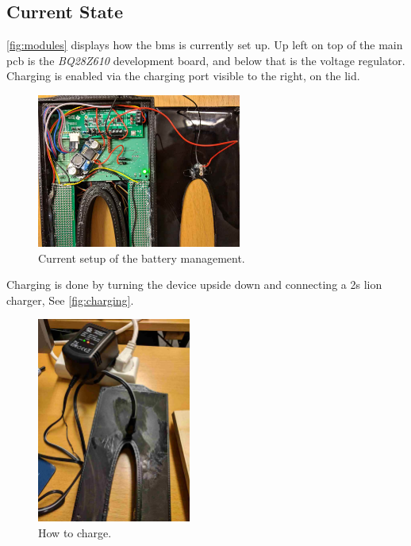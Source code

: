 \subsection{Current State}
\autoref{fig:modules} displays how the \gls{bms} is currently set up. Up left on top of the main \gls{pcb} is the \emph{BQ28Z610} development board, and below that is the voltage regulator. Charging is enabled via the charging port visible to the right, on the lid.
\begin{figure}[H]
	\centering
	\includegraphics[width=0.6\textwidth]{Figures/modules.jpg}
	\caption{Current setup of the battery management.}
	\label{fig:modules}
\end{figure}

Charging is done by turning the device upside down and connecting a \gls{2s} \gls{lion} charger, See \autoref{fig:charging}.
\begin{figure}[H]
	\centering
	\includegraphics[width=0.45\textwidth]{Figures/charging.jpg}
	\caption{How to charge.}
	\label{fig:charging}
\end{figure}

